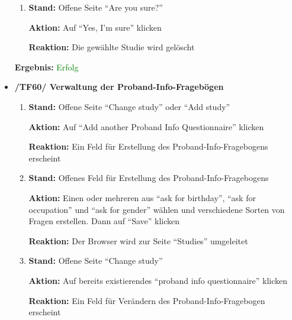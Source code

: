 \documentclass[a4paper]{scrreprt}
\begin{document}
\begin{itemize}
\begin{enumerate}
		      						\item \par \textbf{Stand: }Offene Seite ``Are you sure?''
		                                    \par \textbf{Aktion: }Auf ``Yes, I'm sure'' klicken
		                                    \par \textbf{Reaktion: }Die gew\"ahlte Studie wird gel\"oscht
		                          \end{enumerate}
		      					\vspace*{0.3cm}
		      		           \par \textbf{Ergebnis: }\textcolor{green}{Erfolg}
		      		           \vspace*{0.6cm}
		      		
		                      \item \textbf{/TF60/ Verwaltung der Proband-Info-Frageb\"ogen}
		                          \begin{enumerate}
		                              \item \par \textbf{Stand: }Offene Seite ``Change study'' oder ``Add study''
		                                    \par \textbf{Aktion: }Auf ``Add another Proband Info Questionnaire'' klicken
		                                    \par \textbf{Reaktion: }Ein Feld f\"ur Erstellung des Proband-Info-Fragebogens erscheint
		                              \item \par \textbf{Stand: }Offenes Feld f\"ur Erstellung des Proband-Info-Fragebogens
		                                    \par \textbf{Aktion: }Einen oder mehreren aus ``ask for birthday'', ``ask for occupation'' und ``ask for gender'' w\"ahlen und verschiedene Sorten von Fragen erstellen. Dann auf ``Save'' klicken
		                                    \par \textbf{Reaktion: }Der Browser wird zur Seite ``Studies'' umgeleitet
		                              \item \par \textbf{Stand: }Offene Seite ``Change study''
		                                    \par \textbf{Aktion: }Auf bereits existierendes ``proband info questionnaire'' klicken
		                                    \par \textbf{Reaktion: }Ein Feld f\"ur Ver\"andern des Proband-Info-Fragebogen erscheint

\end{enumerate}
\end{itemize}
\end{document}
